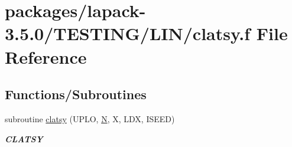 \hypertarget{clatsy_8f}{}\section{packages/lapack-\/3.5.0/\+T\+E\+S\+T\+I\+N\+G/\+L\+I\+N/clatsy.f File Reference}
\label{clatsy_8f}
\subsection*{Functions/\+Subroutines}
\begin{DoxyCompactItemize}
\item 
subroutine \hyperlink{group__complex__lin_gaff37584c2c01f51e536f71fb462bc402}{clatsy} (U\+P\+L\+O, \hyperlink{polmisc_8c_a0240ac851181b84ac374872dc5434ee4}{N}, X, L\+D\+X, I\+S\+E\+E\+D)
\begin{DoxyCompactList}\small\item\em {\bfseries C\+L\+A\+T\+S\+Y} \end{DoxyCompactList}\end{DoxyCompactItemize}
